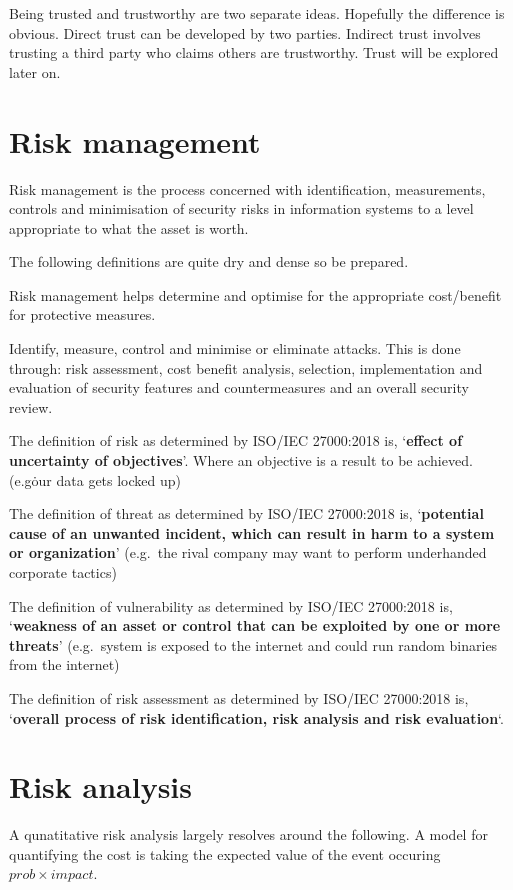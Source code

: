 \documentclass{report}
\begin{document}
Being trusted and trustworthy are two separate ideas.
Hopefully the difference is obvious.
Direct trust can be developed by two parties.
Indirect trust involves trusting a third party who claims others are trustworthy.
Trust will be explored later on.

\section{Risk management}
Risk management is the process concerned with identification, measurements,
controls and minimisation of security risks in information systems to a level
appropriate to what the asset is worth.

The following definitions are quite dry and dense so be prepared.

Risk management helps determine and optimise for the appropriate cost/benefit
for protective measures.

Identify, measure, control and minimise or eliminate attacks.
This is done through: risk assessment, cost benefit analysis, selection,
implementation and evaluation of security features and countermeasures and
an overall security review.

The definition of risk as determined by ISO/IEC 27000:2018 is,
`\textbf{effect of uncertainty of objectives}'.
Where an objective is a result to be achieved. (e.g\. our data gets locked up)

The definition of threat as determined by ISO/IEC 27000:2018 is,
`\textbf{potential cause of an unwanted incident,
which can result in harm to a system
or organization}' (e.g.\ the rival company may want to perform underhanded
corporate tactics)

The definition of vulnerability as determined by ISO/IEC 27000:2018 is,
`\textbf{weakness of an asset or control that can be exploited by one or more
threats}' (e.g.\ system is exposed to the internet and could run random
binaries from the internet)

The definition of risk assessment as determined by ISO/IEC 27000:2018 is,
`\textbf{overall process of risk identification, risk analysis and risk
evaluation}`.

\section{Risk analysis}
A qunatitative risk analysis largely resolves around the following.
A model for quantifying the cost is taking the expected value of the
event occuring $prob \times impact$.
\end{document}
